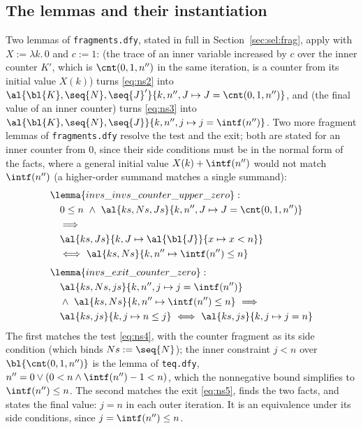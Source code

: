 \subsection{The lemmas and their instantiation}
Two lemmas of \texttt{fragments.dfy}, stated in full in Section~\ref{sec:sel:frag}, apply with
$X := \lambda k.\, 0$ and $c := 1$:  (the trace of an inner variable increased
by $c$ over the inner counter $K'$, which is $\cnt(0, 1, n'')$ in the same iteration, is a counter from
its initial value $X(k)$) turns \eqref{eq:ns2} into
$\al{\bl{K}, \seq{N}, \seq{J}'}{k, n'', J \mapsto J = \cnt(0, 1, n'')}$, and
 (the final value of an inner counter) turns \eqref{eq:ns3} into
$\al{\bl{K}, \seq{N}, \seq{J}}{k, n'', j \mapsto j = \intf(n'')}$. Two more fragment lemmas of
\texttt{fragments.dfy} resolve the test and the exit; both are stated for an inner counter from $0$,
since their side conditions must be in the normal form of the facts, where a general initial value
$X(k) + \intf(n'')$ would not match $\intf(n'')$ (a higher-order summand matches a single summand):
\begin{align*}
  &\lemma{invs\_invs\_counter\_upper\_zero}:\\
  &\quad 0 \le n\ \wedge\ \al{ks, Ns, Js}{k, n'', J \mapsto J = \cnt(0, 1, n'')}\\
  &\quad\Longrightarrow\\
  &\quad \al{ks, Js}{k, J \mapsto \al{\bl{J}}{x \mapsto x < n}}\\
  &\quad\Longleftrightarrow\ \al{ks, Ns}{k, n'' \mapsto \intf(n'') \le n}\\[4pt]
  &\lemma{invs\_exit\_counter\_zero}:\\
  &\quad \al{ks, Ns, js}{k, n'', j \mapsto j = \intf(n'')}\\
  &\quad\wedge\ \al{ks, Ns}{k, n'' \mapsto \intf(n'') \le n}\ \Longrightarrow\\
  &\quad \al{ks, js}{k, j \mapsto n \le j}\ \Longleftrightarrow\ \al{ks, js}{k, j \mapsto j = n}
\end{align*}
The first matches the test \eqref{eq:ns4}, with the counter fragment as its side condition (which binds
$Ns := \seq{N}$); the inner constraint $j < n$ over $\bl{\cnt(0, 1, n'')}$ is the lemma
 of \texttt{teq.dfy}, $n'' = 0 \vee (0 < n \wedge \intf(n'') - 1 < n)$,
which the nonnegative bound simplifies to $\intf(n'') \le n$. The second matches the exit
\eqref{eq:ns5}, finds the two facts, and states the final value: $j = n$ in each outer iteration. It is
an equivalence under its side conditions, since $j = \intf(n'') \le n$.

